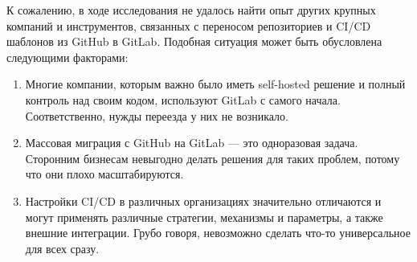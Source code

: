 К сожалению, в ходе исследования не удалось найти опыт других крупных компаний и инструментов, связанных с переносом репозиториев и CI/CD шаблонов из GitHub в GitLab.
Подобная ситуация может быть обусловлена следующими факторами:
\begin{enumerate}
  \item Многие компании, которым важно было иметь self-hosted решение и полный контроль над своим кодом, используют GitLab с самого начала.
        Соответственно, нужды переезда у них не возникало.

  \item Массовая миграция с GitHub на GitLab — это одноразовая задача.
        Сторонним бизнесам невыгодно делать решения для таких проблем, потому что они плохо масштабируются.

  \item Настройки CI/CD в различных организациях значительно отличаются и могут применять различные стратегии,
        механизмы и параметры, а также внешние интеграции.
        Грубо говоря, невозможно сделать что-то универсальное для всех сразу.
\end{enumerate}
